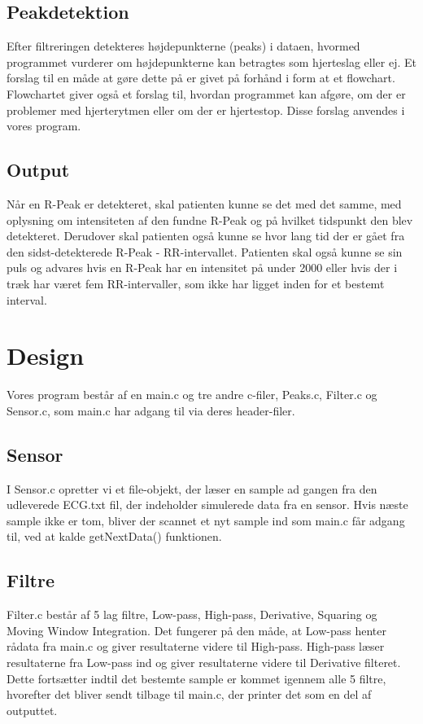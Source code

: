 \documentclass{article}
\begin{document}
\subsection{Peakdetektion}
Efter filtreringen detekteres højdepunkterne (peaks) i dataen, hvormed programmet vurderer om højdepunkterne kan betragtes som hjerteslag eller ej. Et forslag til en måde at gøre dette på er givet på forhånd i form at et flowchart. Flowchartet giver også et forslag til, hvordan programmet kan afgøre, om der er problemer med hjerterytmen eller om der er hjertestop. Disse forslag anvendes i vores program.

\subsection{Output}
Når en R-Peak er detekteret, skal patienten kunne se det med det samme, med oplysning om intensiteten af den fundne R-Peak og på hvilket tidspunkt den blev detekteret. Derudover skal patienten også kunne se hvor lang tid der er gået fra den sidst-detekterede R-Peak - RR-intervallet. Patienten skal også kunne se sin puls og advares hvis en R-Peak har en intensitet på under 2000 eller hvis der i træk har været fem RR-intervaller, som ikke har ligget inden for et bestemt interval.

\section{Design}
Vores program består af en main.c og tre andre c-filer, Peaks.c, Filter.c og Sensor.c, som main.c har adgang til via deres header-filer. 

\subsection{Sensor}
I Sensor.c opretter vi et file-objekt, der læser en sample ad gangen fra den udleverede ECG.txt fil, der indeholder simulerede data fra en sensor. Hvis næste sample ikke er tom, bliver der scannet et nyt sample ind som main.c får adgang til, ved at kalde getNextData() funktionen.

\subsection{Filtre}
Filter.c består af 5 lag filtre, Low-pass, High-pass, Derivative, Squaring og Moving Window Integration. Det fungerer på den måde, at Low-pass henter rådata fra main.c og giver resultaterne videre til High-pass. High-pass læser resultaterne fra Low-pass ind og giver resultaterne videre til Derivative filteret. Dette fortsætter indtil det bestemte sample er kommet igennem alle 5 filtre, hvorefter det bliver sendt tilbage til main.c, der printer det som en del af outputtet.
\end{document}
